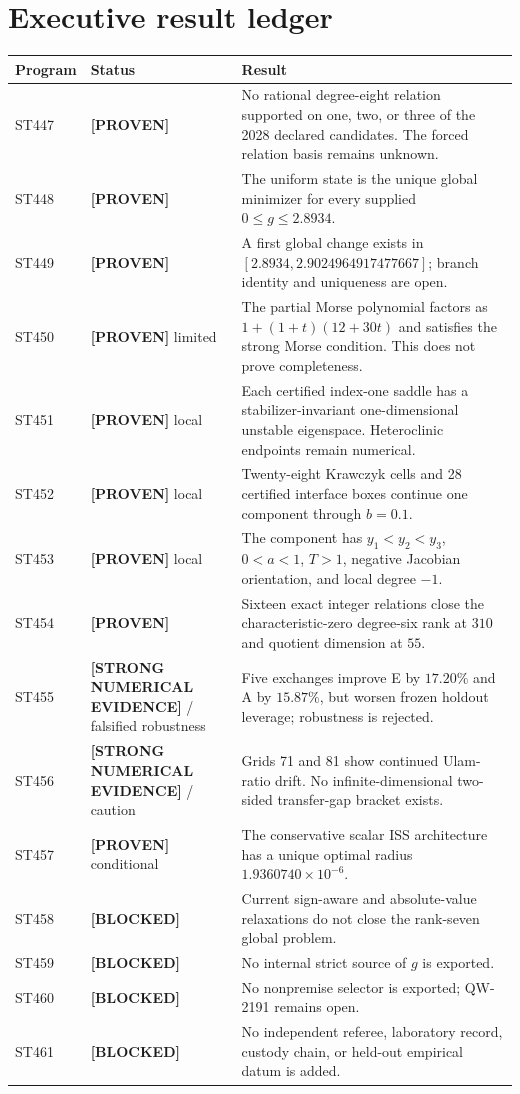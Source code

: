 \documentclass[11pt,a4paper]{article}
\newcommand{\Proven}{\textcolor{green!38!black}{\textbf{[PROVEN]}}}
\newcommand{\Evidence}{\textcolor{orange!80!black}{\textbf{[STRONG NUMERICAL EVIDENCE]}}}
\newcommand{\Blocked}{\textcolor{red!65!black}{\textbf{[BLOCKED]}}}
\begin{document}
\section{Executive result ledger}
\small
\begin{longtable}{>{\raggedright\arraybackslash}p{}>{\raggedright\arraybackslash}p{}>{\raggedright\arraybackslash}p{}}
\toprule Program&Status&Result\\\midrule\endhead
ST447&\Proven{}&No rational degree-eight relation supported on one, two, or three of the 2028 declared candidates.  The forced relation basis remains unknown.\\
ST448&\Proven{}&The uniform state is the unique global minimizer for every supplied $0\le g\le2.8934$.\\
ST449&\Proven{}&A first global change exists in $[2.8934,2.9024964917477667]$; branch identity and uniqueness are open.\\
ST450&\Proven{} limited&The partial Morse polynomial factors as $1+(1+t)(12+30t)$ and satisfies the strong Morse condition.  This does not prove completeness.\\
ST451&\Proven{} local&Each certified index-one saddle has a stabilizer-invariant one-dimensional unstable eigenspace.  Heteroclinic endpoints remain numerical.\\
ST452&\Proven{} local&Twenty-eight Krawczyk cells and 28 certified interface boxes continue one component through $b=0.1$.\\
ST453&\Proven{} local&The component has $y_1<y_2<y_3$, $0<a<1$, $T>1$, negative Jacobian orientation, and local degree $-1$.\\
ST454&\Proven{}&Sixteen exact integer relations close the characteristic-zero degree-six rank at $310$ and quotient dimension at $55$.\\
ST455&\Evidence{} / falsified robustness&Five exchanges improve E by $17.20\%$ and A by $15.87\%$, but worsen frozen holdout leverage; robustness is rejected.\\
ST456&\Evidence{} / caution&Grids 71 and 81 show continued Ulam-ratio drift.  No infinite-dimensional two-sided transfer-gap bracket exists.\\
ST457&\Proven{} conditional&The conservative scalar ISS architecture has a unique optimal radius $1.9360740\times10^{-6}$.\\
ST458&\Blocked&Current sign-aware and absolute-value relaxations do not close the rank-seven global problem.\\
ST459&\Blocked&No internal strict source of $g$ is exported.\\
ST460&\Blocked&No nonpremise selector is exported; QW-2191 remains open.\\
ST461&\Blocked&No independent referee, laboratory record, custody chain, or held-out empirical datum is added.\\
\bottomrule
\end{longtable}
\normalsize
\end{document}
